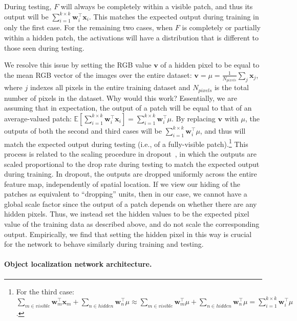 \documentclass[10pt,twocolumn,letterpaper]{article}
\begin{document}
During testing, $F$ will always be completely within a visible patch, and thus its output will be $\sum_{i=1}^{k \times k} \mathbf{w}_i^\top \mathbf{x}_i$.  This matches the expected output during training in only the first case.  For the remaining two cases, when $F$ is completely or partially within a hidden patch, the activations will have a distribution that is different to those seen during testing.

We resolve this issue by setting the RGB value $\mathbf{v}$ of a hidden pixel to be equal to the mean RGB vector of the images over the entire dataset: $\mathbf{v} = \mu = \frac{1}{N_{pixels}} \sum_j \mathbf{x}_j$, where $j$ indexes all pixels in the entire training dataset and $N_{pixels}$ is the total number of pixels in the dataset.  Why would this work?  Essentially, we are assuming that in expectation, the output of a patch will be equal to that of an average-valued patch: $\mathbb{E} [\sum_{i=1}^{k \times k} \mathbf{w}_i^\top \mathbf{x}_i] = \sum_{i=1}^{k \times k} \mathbf{w}_i^\top \mu$.  By replacing $\mathbf{v}$ with $\mu$, the outputs of both the second and third cases will be $\sum_{i=1}^{k \times k} \mathbf{w}_i^\top \mu$, and thus will match the expected output during testing (i.e., of a fully-visible patch).\footnote{For the third case: $\sum_{m \in visible} \mathbf{w}_m^\top \mathbf{x}_m + \sum_{n \in hidden} \mathbf{w}_n^\top \mu \approx \sum_{m \in visible} \mathbf{w}_m^\top \mu + \sum_{n \in hidden} \mathbf{w}_n^\top \mu = \sum_{i=1}^{k \times k} \mathbf{w}_i^\top \mu$.}
This process is related to the scaling procedure in dropout~\cite{srivastava-jmlr2014}, in which the outputs are scaled proportional to the drop rate during testing to match the expected output during training.  In dropout, the outputs are dropped uniformly across the entire feature map, independently of spatial location.  If we view our hiding of the patches as equivalent to ``dropping'' units, then in our case, we cannot have a global scale factor since the output of a patch depends on whether there are any hidden pixels.  Thus, we instead set the hidden values to be the expected pixel value of the training data as described above, and do not scale the corresponding output.  Empirically, we find that setting the hidden pixel in this way is crucial for the network to behave similarly during training and testing. 

\vspace{-10pt}\paragraph{Object localization network architecture.}%
\end{document}
